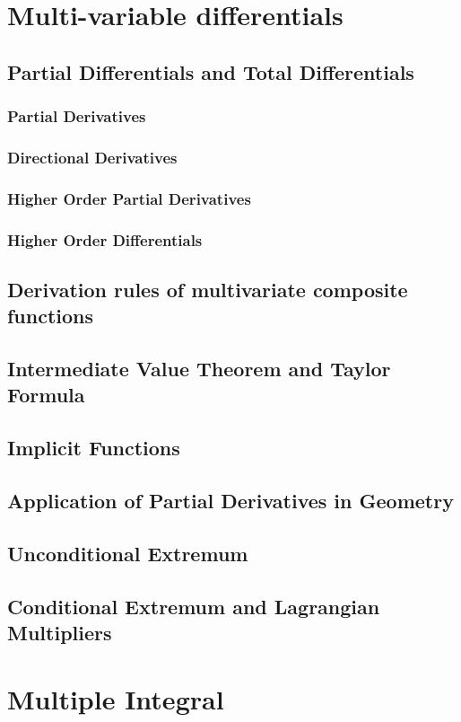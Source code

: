 \documentclass{article}
\newcommand{\0}{{\bf{0}}}
\begin{document}
\section{Multi-variable differentials}
\subsection{Partial Differentials and Total Differentials}
\subsubsection{Partial Derivatives}
\subsubsection{Directional Derivatives}
\subsubsection{Higher Order Partial Derivatives}
\subsubsection{Higher Order Differentials}
\subsection{Derivation rules of multivariate composite functions}
\subsection{Intermediate Value Theorem and Taylor Formula}
\subsection{Implicit Functions}
\subsection{Application of Partial Derivatives in Geometry}
\subsection{Unconditional Extremum}
\subsection{Conditional Extremum and Lagrangian Multipliers}
\section{Multiple Integral}
\end{document}
